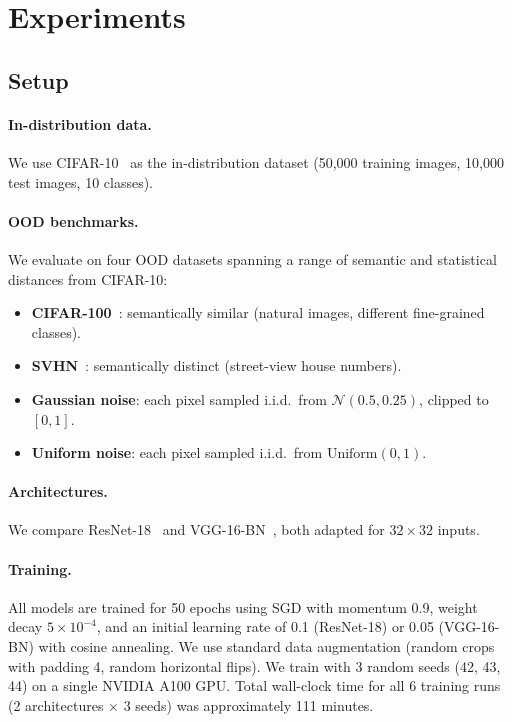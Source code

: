 \documentclass{article}
\begin{document}
\section{Experiments}
\label{sec:experiments}

\subsection{Setup}
\label{sec:setup}

\paragraph{In-distribution data.} We use CIFAR-10~\citep{krizhevsky2009learning} as the in-distribution dataset (50,000 training images, 10,000 test images, 10 classes).

\paragraph{OOD benchmarks.} We evaluate on four OOD datasets spanning a range of semantic and statistical distances from CIFAR-10:
\begin{itemize}
    \item \textbf{CIFAR-100}~\citep{krizhevsky2009learning}: semantically similar (natural images, different fine-grained classes).
    \item \textbf{SVHN}~\citep{netzer2011reading}: semantically distinct (street-view house numbers).
    \item \textbf{Gaussian noise}: each pixel sampled i.i.d.\ from $\mathcal{N}(0.5, 0.25)$, clipped to $[0,1]$.
    \item \textbf{Uniform noise}: each pixel sampled i.i.d.\ from $\text{Uniform}(0, 1)$.
\end{itemize}

\paragraph{Architectures.} We compare ResNet-18~\citep{he2016deep} and VGG-16-BN~\citep{simonyan2015very}, both adapted for $32 \times 32$ inputs.

\paragraph{Training.} All models are trained for 50 epochs using SGD with momentum 0.9, weight decay $5 \times 10^{-4}$, and an initial learning rate of 0.1 (ResNet-18) or 0.05 (VGG-16-BN) with cosine annealing. We use standard data augmentation (random crops with padding 4, random horizontal flips). We train with 3 random seeds (42, 43, 44) on a single NVIDIA A100 GPU. Total wall-clock time for all 6 training runs (2 architectures $\times$ 3 seeds) was approximately 111 minutes.
\end{document}
